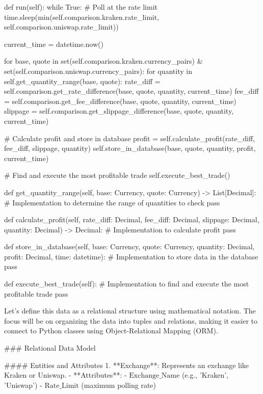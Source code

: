     def run(self):
        while True:
            # Poll at the rate limit
            time.sleep(min(self.comparison.kraken.rate_limit, self.comparison.uniswap.rate_limit))
            
            current_time = datetime.now()
            
            for base, quote in set(self.comparison.kraken.currency_pairs) & set(self.comparison.uniswap.currency_pairs):
                for quantity in self.get_quantity_range(base, quote):
                    rate_diff = self.comparison.get_rate_difference(base, quote, quantity, current_time)
                    fee_diff = self.comparison.get_fee_difference(base, quote, quantity, current_time)
                    slippage = self.comparison.get_slippage_difference(base, quote, quantity, current_time)
                    
                    # Calculate profit and store in database
                    profit = self.calculate_profit(rate_diff, fee_diff, slippage, quantity)
                    self.store_in_database(base, quote, quantity, profit, current_time)

            # Find and execute the most profitable trade
            self.execute_best_trade()

    def get_quantity_range(self, base: Currency, quote: Currency) -> List[Decimal]:
        # Implementation to determine the range of quantities to check
        pass

    def calculate_profit(self, rate_diff: Decimal, fee_diff: Decimal, slippage: Decimal, quantity: Decimal) -> Decimal:
        # Implementation to calculate profit
        pass

    def store_in_database(self, base: Currency, quote: Currency, quantity: Decimal, profit: Decimal, time: datetime):
        # Implementation to store data in the database
        pass

    def execute_best_trade(self):
        # Implementation to find and execute the most profitable trade
        pass



        Let's define this data as a relational structure using mathematical notation. The focus will be on organizing the data into tuples and relations, making it easier to connect to Python classes using Object-Relational Mapping (ORM).

### Relational Data Model

#### Entities and Attributes
1. **Exchange**: Represents an exchange like Kraken or Uniswap.
   - **Attributes**:
     - \( \text{Exchange\_Name} \) (e.g., 'Kraken', 'Uniswap')
     - \( \text{Rate\_Limit} \) (maximum polling rate)

